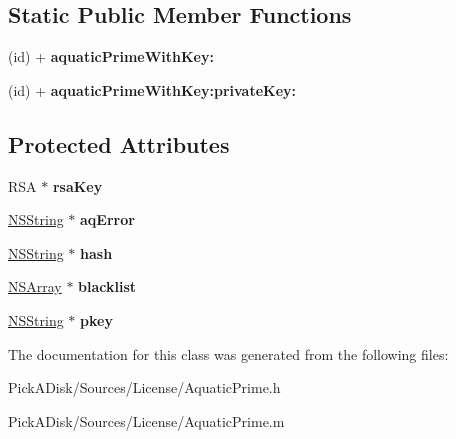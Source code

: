 \subsection*{Static Public Member Functions}
\begin{DoxyCompactItemize}
\item 
\hypertarget{interface_aquatic_prime_ad06bd17d62c22452aa6421ed544a2b06}{
(id) + {\bfseries aquaticPrimeWithKey:}}
\label{interface_aquatic_prime_ad06bd17d62c22452aa6421ed544a2b06}

\item 
\hypertarget{interface_aquatic_prime_ab52482614697b1cb0a3688471ad9d97b}{
(id) + {\bfseries aquaticPrimeWithKey:privateKey:}}
\label{interface_aquatic_prime_ab52482614697b1cb0a3688471ad9d97b}

\end{DoxyCompactItemize}
\subsection*{Protected Attributes}
\begin{DoxyCompactItemize}
\item 
\hypertarget{interface_aquatic_prime_a17b0dff0211fa596cf4bba58afcafcae}{
RSA $\ast$ {\bfseries rsaKey}}
\label{interface_aquatic_prime_a17b0dff0211fa596cf4bba58afcafcae}

\item 
\hypertarget{interface_aquatic_prime_ac1bc7e00b96abb5eaaf06c0ccf879e88}{
\hyperlink{class_n_s_string}{NSString} $\ast$ {\bfseries aqError}}
\label{interface_aquatic_prime_ac1bc7e00b96abb5eaaf06c0ccf879e88}

\item 
\hypertarget{interface_aquatic_prime_a2c7cf637b8c304db0dd4002e6705de26}{
\hyperlink{class_n_s_string}{NSString} $\ast$ {\bfseries hash}}
\label{interface_aquatic_prime_a2c7cf637b8c304db0dd4002e6705de26}

\item 
\hypertarget{interface_aquatic_prime_a77fd85f9248a8d051ce3bb953286f558}{
\hyperlink{class_n_s_array}{NSArray} $\ast$ {\bfseries blacklist}}
\label{interface_aquatic_prime_a77fd85f9248a8d051ce3bb953286f558}

\item 
\hypertarget{interface_aquatic_prime_ac464473140490128ff8db5f6973f5211}{
\hyperlink{class_n_s_string}{NSString} $\ast$ {\bfseries pkey}}
\label{interface_aquatic_prime_ac464473140490128ff8db5f6973f5211}

\end{DoxyCompactItemize}


The documentation for this class was generated from the following files:\begin{DoxyCompactItemize}
\item 
PickADisk/Sources/License/AquaticPrime.h\item 
PickADisk/Sources/License/AquaticPrime.m\end{DoxyCompactItemize}
